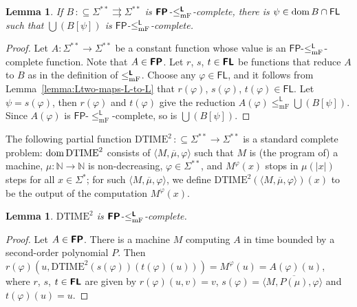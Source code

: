 \documentclass[conference]{IEEEtran}
\newcommand{\N}{\mathbb N}
\newcommand{\classonefont}[1]{\mathsf{#1}}
\newcommand{\classL}{\classonefont{L}}
\newcommand{\classFL}{\classonefont{FL}}
\newcommand{\classFP}{\classonefont{FP}}
\newcommand{\classtwofont}[1]{\text{\bfseries \sffamily \upshape #1}}
\newcommand{\classLtwo}{\classtwofont{L}}
\newcommand{\classFLtwo}{\classtwofont{FL}}
\newcommand{\classFPtwo}{\classtwofont{FP}}
\newcommand{\redmF}{\leq _{\mathrm{mF}}}
\newcommand{\redLmF}{\redmF ^{\classLtwo}}
\newcommand{\LM}{\varSigma ^{**}}
\newcommand{\probDTIMEtwo}{\mathrm{DTIME}^2}
\newcommand{\probCVPtwo}{\mathrm{CVP}^2}
\newcommand{\dom}{\mathop{\rm dom}}
\newcommand{\OR}{\mathrm{OR}}
\newcommand{\NOT}{\mathrm{NOT}}
\newcommand{\AND}{\mathrm{AND}}
\newtheorem{lemma}[theorem]{Lemma}
\theoremstyle{definition}
\theoremstyle{remark}
\newcommand{\pcolon}{\mathpunct{\,:\subseteq}}
\begin{document}
\begin{lemma}
\label{lemma:P-complete}
If $B \pcolon \LM \rightrightarrows \LM$ is $\classFPtwo$-$\redLmF$-complete, 
there is $\psi \in \dom B \cap \classFL$ such that
 $\bigcup (B[\psi])$ is $\classFP$-$\redoneLmF$-complete. 
\end{lemma}

\begin{proof}
Let $A \colon \LM \to \LM$ be a constant function 
whose value is 
an $\classFP$-$\redoneLmF$-complete function. 
Note that $A \in \classFPtwo$.
Let $r$, $s$, $t \in \classFLtwo$ be functions that reduce $A$ to $B$
as in the definition of $\redLmF$.
Choose any $\varphi \in \classFL$, 
and it follows from Lemma~\ref{lemma:Ltwo-maps-L-to-L}
that $r(\varphi)$, $s(\varphi)$, $t(\varphi) \in \classFL$.
Let $\psi = s(\varphi)$, then $r (\varphi)$ and $t (\varphi)$ 
give the reduction 
$A (\varphi) \redmF^\classL \bigcup (B[\psi])$.
Since $A(\varphi)$ is $\classFP$-$\redmF^\classL$-complete,
so is $\bigcup (B[\psi])$.
\end{proof}

The following partial function $\probDTIMEtwo \pcolon \LM \to \LM$ 
is a standard complete problem: 
$\dom \probDTIMEtwo$ consists of $\langle M, \overline \mu, \varphi \rangle$
such that $M$ is (the program of) a machine, 
$\mu \colon \N \to \N$ is non-decreasing, 
$\varphi \in \LM$, 
and $M^\varphi(x)$ stops in $\mu(|x|)$ steps for all $x \in \varSigma^*$; 
for such $\langle M, \overline \mu, \varphi \rangle$, 
we define $\probDTIMEtwo(\langle M, \overline \mu, \varphi \rangle)(x)$ to be 
the output of the computation $M^\varphi(x)$.

\begin{lemma}
\label{lemma: probDTIMEtwo}
 $\probDTIMEtwo$ is $\classFPtwo$-$\redLmF$-complete.
\end{lemma}

\begin{proof}
 Let $A \in \classFPtwo$. 
 There is a machine $M$ computing $A$
 in time bounded by a second-order polynomial $P$. 
 Then $r (\varphi) (u, \probDTIMEtwo(s(\varphi))(t(\varphi)(u))) = M ^\varphi (u) = A (\varphi) (u)$, 
 where 
 $r$, $s$, $t \in \classFLtwo$ are given by 
 $r (\varphi) (u, v) = v$, 
 $s (\varphi) = \langle M, \overline{P(\mu)}, \varphi \rangle$ and 
 $t (\varphi) (u) = u$.
\end{proof}

\end{document}
